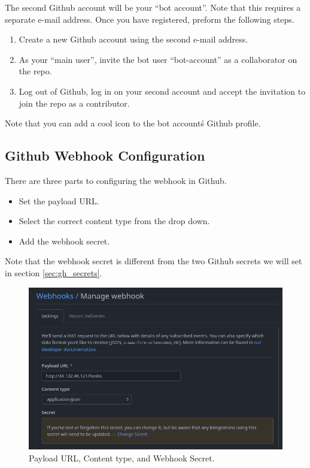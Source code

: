 \justifying
The second Github account will be your ``bot account''. Note that this requires a separate e-mail address. Once you have registered,
preform the following steps.
\vspace{2mm}

\justifying
\begin{raggedright}
	\begin{enumerate}
		\item Create a new Github account using the second e-mail address.
		\item As your ``main user'', invite the bot user ``bot-account'' as a collaborator on the repo.
		\item Log out of Github, log in on your second account and accept the invitation to join the repo as a contributor.
	\end{enumerate}
\end{raggedright}
\vspace{2mm}

\justifying
Note that you can add a cool icon to the bot account\'s Github profile.


\subsection{\label{sec:webhook}Github Webhook Configuration}

\justifying
There are three parts to configuring the webhook in Github. 

\justifying
\begin{raggedright}
	\begin{itemize}
		\item Set the payload URL.
		\item Select the correct content type from the drop down.
		\item Add the webhook secret.
	\end{itemize}
\end{raggedright}
\vspace{2mm}

\justifying
Note that the webhook secret is different from the two Github secrets we will set in section \ref{sec:gh_secrets}.

\begin{figure}[ht]
	\includegraphics[width=12cm]{images/webhook1.png}
	\caption{Payload URL, Content type, and Webhook Secret.}
	\label{wh1}
\end{figure}
\vspace{2mm}


